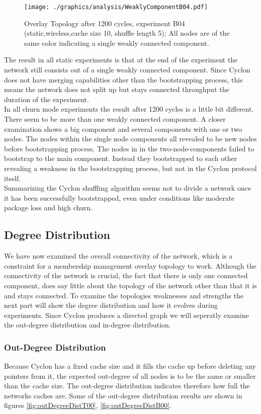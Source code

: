 \begin{figure}
	\texttt{[image: ./graphics/analysis/WeaklyComponentB04.pdf]}
	\caption{Overlay Topology after 1200 cycles, experiment B04
	(static,wireless,cache size 10, shuffle length 5); All nodes are of the same
	color indicating a single weakly connected component.}
	\label{fig:WeaklyCompB04}
\end{figure}

The result in all static experiments is that at the end of the experiment the
network still consists out of a single weakly connected component. Since Cyclon does not have
merging capabilities other than the bootstrapping process, this means the
network does not split up but stays connected throughput the duration of the
experiment.\\
In all churn mode experiments the result after 1200 cycles is a little bit
different. There seem to be more than one weakly connected component. A closer
examination shows a big component and several components with one or two
nodes. The nodes within the single node components all revealed to be new nodes
before bootstrapping process. The nodes in in the two-node-components failed to
bootstrap to the main component. Instead they bootstrapped to each other
revealing a weakness in the bootstrapping process, but not in the Cyclon
protocol itself.\\
Summarizing the Cyclon shuffling algorithm seems not to divide a network once it
has been successfully bootstrapped, even under conditions like moderate package
loss and high churn.

\subsection{Degree Distribution}
We have now examined the overall connectivity of the network, which is a
constraint for a membership management overlay topology to work. Although the
connectivity of the network is crucial, the fact that there is only one
connected component, does say little about the topology of the network other
than that it is and stays connected. To examine the topologies weaknesses and
strengths the next part will show the degree distribution and how it evolves
during experiments. Since Cyclon produces a directed graph we will seperatly
examine the out-degree distribution and in-degree distribution.
\subsubsection{Out-Degree Distribution}
\label{subsubsec:outDegree}
Because Cyclon has a fixed cache size and it fills the cache up before deleting
any pointers from it, the expected out-degree of all nodes is to be the same or
smaller than the cache size. The out-degree distribution indicates therefore how
full the networks caches are. Some of the out-degree distribution results are
shown in figures \ref{fig:outDegreeDistT00}, \ref{fig:outDegreeDistB00}. \\

